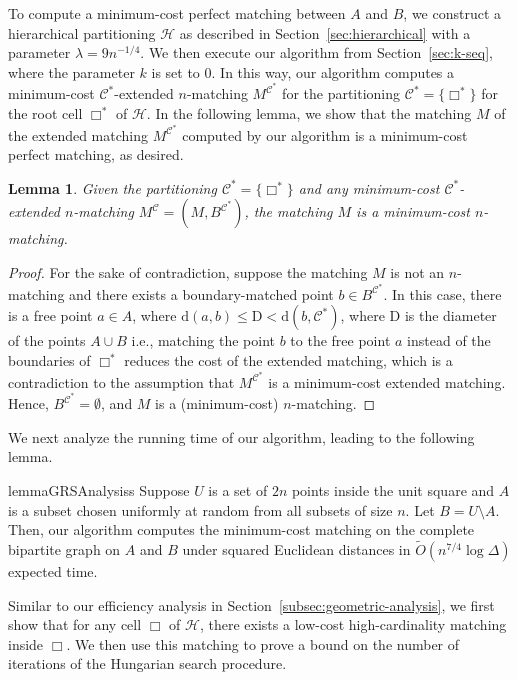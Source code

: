 \documentclass[11pt,onecolumn]{article}
\def\mcC{{\mathcal{C}}}
\def\mcH{{\mathcal{H}}}
\newcommand{\cell}{\Box}
\newcommand{\distance}[2]{\mathrm{d}(#1, #2)}
\newcommand{\diam}{\mathrm{D}}
\newtheorem{lemma}{Lemma}[section]
\begin{document}
%
To compute a minimum-cost perfect matching between $A$ and $B$, we construct a hierarchical partitioning $\mcH$ as described in Section~\ref{sec:hierarchical} with a parameter $\lambda = 9n^{-1/4}$. We then execute our algorithm from Section~\ref{sec:k-seq}, where the parameter $k$ is set to $0$. In this way, our algorithm computes a minimum-cost $\mcC^*$-extended $n$-matching $M^{\mcC^*}$ for the partitioning $\mcC^*=\{\cell^*\}$ for the root cell $\cell^*$ of $\mcH$. In the following lemma, we show that the matching $M$ of the extended matching $M^{\mcC^*}$ computed by our algorithm is a minimum-cost perfect matching, as desired.

\begin{lemma}
    Given the partitioning $\mcC^*=\{\cell^*\}$ and any minimum-cost $\mcC^*$-extended $n$-matching $M^\mcC=(M, B^{\mcC^*})$, the matching $M$ is a minimum-cost $n$-matching.
\end{lemma}
\begin{proof}
    For the sake of contradiction, suppose the matching $M$ is not an $n$-matching and there exists a boundary-matched point $b\in B^{\mcC^*}$. In this case, there is a free point $a\in A$, where $\distance{a}{b}\le \diam <\distance{b}{\mcC^*}$, where $\diam$ is the diameter of the points $A\cup B$ i.e., matching the point $b$ to the free point $a$ instead of the boundaries of $\cell^*$ reduces the cost of the extended matching, which is a contradiction to the assumption that $M^{\mcC^*}$ is a minimum-cost extended matching. Hence, $B^{\mcC^*}=\emptyset$, and $M$ is a (minimum-cost) $n$-matching.
\end{proof}


%



We next analyze the running time of our algorithm, leading to the following lemma.


\begin{restatable}{lemma}{GRSAnalysiss}\label{lemma:GRS-analysis-p2}
    Suppose $U$ is a set of $2n$ points inside the unit square and $A$ is a subset chosen uniformly at random from all subsets of size $n$. Let $B=U\setminus A$.  Then, our algorithm computes the minimum-cost matching on the complete bipartite graph on $A$ and $B$ under squared Euclidean distances in $\tilde{O}(n^{7/4}\log \Delta)$ expected time.
\end{restatable} 

%
%
%

Similar to our efficiency analysis in Section~\ref{subsec:geometric-analysis}, we first show that for any cell $\cell$ of $\mcH$, there exists a low-cost high-cardinality matching inside $\cell$. We then use this matching to prove a bound on the number of iterations of the Hungarian search procedure.
\end{document}

